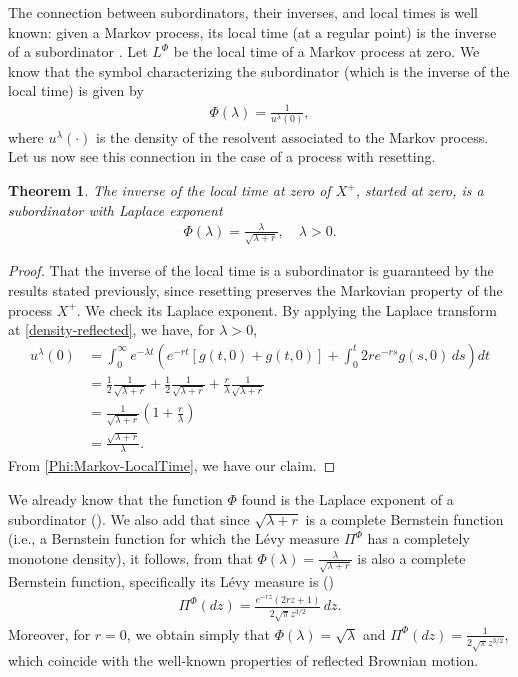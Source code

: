 \documentclass[11pt,a4paper]{article}
\newtheorem{theorem}{Theorem}
\theoremstyle{definition}
\theoremstyle{remark}
\begin{document}
The connection between subordinators, their inverses, and local times is well known: given a Markov process, its local time (at a regular point) is the inverse of a subordinator \cite[Theorem 2.3]{BlumenthalGetoor}. Let \( L^\Phi \) be the local time of a Markov process at zero. We know that the symbol characterizing the subordinator (which is the inverse of the local time) is given by \cite[Proposition 4, Section V.I]{bertoinlevy}
\begin{align}
	\label{Phi:Markov-LocalTime}
	\Phi(\lambda) = \frac{1}{u^\lambda(0)},
\end{align}
where $u^\lambda(\cdot)$ is the density of the resolvent associated to the Markov process. Let us now see this connection in the case of a process with resetting.
\begin{theorem}
	\label{tm:inverselocaltime}
	The inverse of the local time at zero of $X^+$, started at zero, is a subordinator with Laplace exponent
	\begin{align}
		\label{Laplace-exponent}
		\Phi(\lambda)=\frac{\lambda}{\sqrt{\lambda + r}}, \quad \lambda >0.
	\end{align}
\end{theorem}
\begin{proof}
	That the inverse of the local time is a subordinator is guaranteed by the results stated previously, since resetting preserves the Markovian property of the process \(X^+\). We check its Laplace exponent.
	By applying the Laplace transform  at \eqref{density-reflected}, we have, for $\lambda>0$,
	\begin{align*}
		u^\lambda(0)&= \int_0^\infty e^{-\lambda t } \left(e^{-rt} [g(t,0) + g(t, 0)] + \int_{0}^{t} 2r e^{-rs} g(s,0) \, ds\right) dt\\
		&=\frac{1}{2}\frac{1}{\sqrt{\lambda + r}}+ \frac{1}{2}\frac{1}{\sqrt{\lambda + r}} + \frac{r}{\lambda}\frac{1}{\sqrt{\lambda + r}} \\
		&=\frac{1}{\sqrt{\lambda + r}}  \left(1+\frac{r}{\lambda}\right)\\
		&=\frac{\sqrt{\lambda+r}}{\lambda}.
	\end{align*}
	From \eqref{Phi:Markov-LocalTime}, we have our claim.
\end{proof}
We already know that the function \(\Phi\) found is the Laplace exponent of a subordinator (\cite[Theorem 5.2]{schilling2012bernstein}). We also add that since \(\sqrt{\lambda + r}\) is a complete Bernstein function (i.e., a Bernstein function for which the L\'evy measure \(\Pi^\Phi\) has a completely monotone density), it follows, from \cite[Proposition 7.1]{schilling2012bernstein} that \(\Phi(\lambda) = \frac{\lambda}{\sqrt{\lambda + r}}\) is also a complete Bernstein function, specifically its L\'evy measure is (\cite[Section 16.2, Case 5]{schilling2012bernstein})
\begin{align*}
	\Pi^\Phi(dz)= \frac{e^{-rz} (2rz+1)}{2 \sqrt{\pi} z^{3/2}}\, dz.
\end{align*}
Moreover, for \( r = 0 \), we obtain simply that $\Phi(\lambda)=\sqrt{\lambda}$ and $\Pi^\Phi(dz)=\frac{1}{2 \sqrt{\pi} z^{3/2}}$, which coincide with the well-known properties of reflected Brownian motion.
\end{document}
